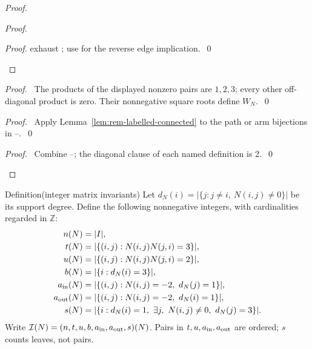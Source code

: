\begin{proof}
\begin{proof}
\begin{proof}
 exhaust ; use
 for the reverse edge implication.~\qed\end{proof}
\end{proof}
\begin{proof}\pf\ The products of the displayed nonzero pairs are
$1,2,3$; every other off-diagonal product is zero.
Their nonnegative square roots define $W_N$.~\qed\end{proof}
\begin{proof}\pf\ Apply Lemma~\ref{lem:rem-labelled-connected}
to the path or arm bijections in --.~\qed\end{proof}
\qedstep
\begin{proof}\pf\ Combine --;
the diagonal clause of each named definition is 2.~\qed\end{proof}
\end{proof}

\begin{namedresult}{Definition}{(integer matrix invariants)}\label{def:rem-invariants}
\uses{}
Let $d_N(i)=|\{j:j\ne i,\ N(i,j)\ne0\}|$ be its support degree.
Define the following nonnegative integers, with cardinalities regarded in $\mathbb Z$:
\begin{equation}\label{eq:rem-invariants}
\begin{aligned}
n(N)&=|I|,\\
t(N)&=|\{(i,j):N(i,j)N(j,i)=3\}|,\\
u(N)&=|\{(i,j):N(i,j)N(j,i)=2\}|,\\
b(N)&=|\{i:d_N(i)=3\}|,\\
a_{\rm in}(N)&=|\{(i,j):N(i,j)=-2,\ d_N(j)=1\}|,\\
a_{\rm out}(N)&=|\{(i,j):N(i,j)=-2,\ d_N(i)=1\}|,\\
s(N)&=|\{i:d_N(i)=1,\ \exists j,\ N(i,j)\ne0,\ d_N(j)=3\}|.
\end{aligned}
\end{equation}
Write $\mathcal I(N)=(n,t,u,b,a_{\rm in},a_{\rm out},s)(N)$.
Pairs in $t,u,a_{\rm in},a_{\rm out}$ are ordered; $s$ counts leaves,
not pairs.
\end{namedresult}

